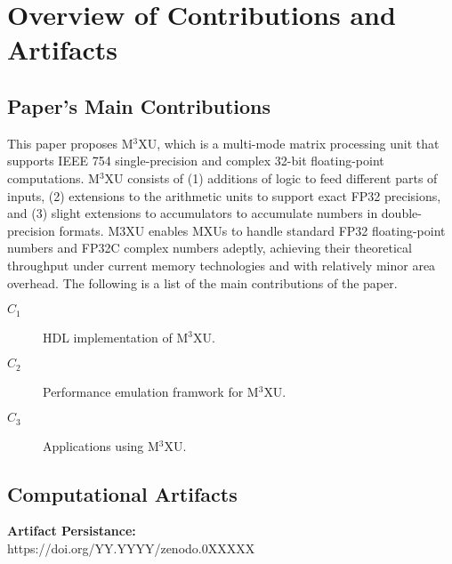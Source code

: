 \documentclass[conference]{IEEEtran}
\newcommand{\MPCMXU}[1]{M$^{3}$XU}
\begin{document}


\appendixAD

\section{Overview of Contributions and Artifacts}

\subsection{Paper's Main Contributions}

This paper proposes \MPCMXU{}, which is a multi-mode matrix processing unit 
that supports IEEE 754 single-precision and complex 32-bit floating-point computations. 
\MPCMXU{} consists of 
(1) additions of logic to feed different parts of inputs, 
(2) extensions to the arithmetic units to support exact FP32 precisions, and 
(3) slight extensions to accumulators to accumulate numbers in double-precision formats. 
M3XU enables MXUs to handle standard FP32 floating-point numbers and FP32C complex numbers adeptly, 
achieving their theoretical throughput under current memory technologies and with relatively minor area overhead.
The following is a list of the main contributions of the paper.

\begin{description}
\item[$C_1$] HDL implementation of \MPCMXU{}.
\item[$C_2$] Performance emulation framwork for \MPCMXU{}.
\item[$C_3$] Applications using \MPCMXU{}.
\end{description}

\subsection{Computational Artifacts}

\noindent\textbf{Artifact Persistance:} \\
https://doi.org/YY.YYYY/zenodo.0XXXXX
\end{document}
